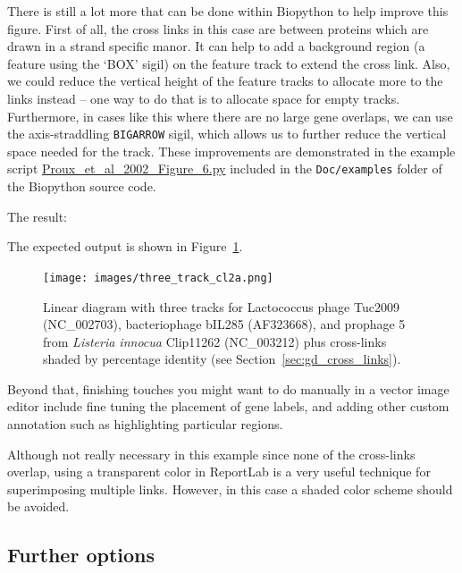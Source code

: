 There is still a lot more that can be done within Biopython to help
improve this figure. First of all, the cross links in this case are
between proteins which are drawn in a strand specific manor. It can
help to add a background region (a feature using the `BOX' sigil) on the
feature track to extend the cross link. Also, we could reduce the vertical
height of the feature tracks to allocate more to the links instead -- one
way to do that is to allocate space for empty tracks. Furthermore,
in cases like this where there are no large gene overlaps, we can use
the axis-straddling \verb|BIGARROW| sigil, which allows us to further
reduce the vertical space needed for the track. These improvements
are demonstrated in the example script
\href{https://github.com/biopython/biopython/blob/master/Doc/examples/Proux_et_al_2002_Figure_6.py}{Proux\_et\_al\_2002\_Figure\_6.py}
included in the \texttt{Doc/examples} folder of the Biopython source code.
\begin{htmlonly}
\noindent The result:


\end{htmlonly}
\begin{latexonly}
\noindent The expected output is shown in Figure~\ref{fig:three_track_cl2}.
\begin{figure}[htbp]
\centering
\texttt{[image: images/three\_track\_cl2a.png]}
\caption{Linear diagram with three tracks for Lactococcus phage Tuc2009
(NC\_002703), bacteriophage bIL285 (AF323668), and prophage 5 from
\textit{Listeria innocua} Clip11262 (NC\_003212) plus cross-links
shaded by percentage identity (see Section~\ref{sec:gd_cross_links}).}
\label{fig:three_track_cl2}
\end{figure}
\end{latexonly}

Beyond that, finishing touches you might want to do manually in a vector
image editor include fine tuning the placement of gene labels, and adding
other custom annotation such as highlighting particular regions.

Although not really necessary in this example since none of the cross-links
overlap, using a transparent color in ReportLab is a very useful technique
for superimposing multiple links. However, in this case a shaded color
scheme should be avoided.

\subsection{Further options}

